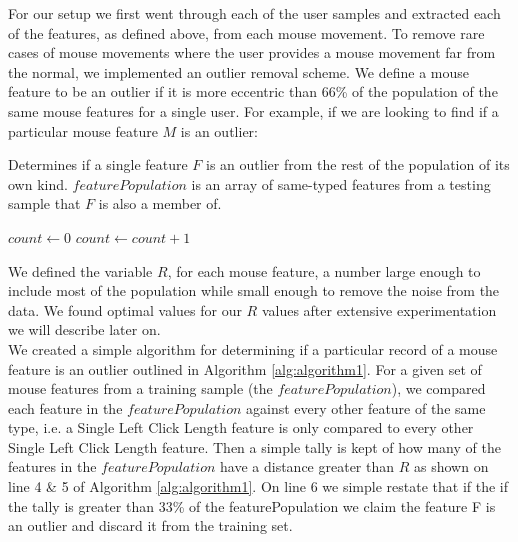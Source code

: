 \documentclass[conference]{IEEEtran}
\begin{document}
For our setup we first went through each of the user samples and extracted each of the features, as defined above, from each mouse movement. To remove rare cases of mouse movements where the user provides a mouse movement far from the normal, we implemented an outlier removal scheme. We define a mouse feature to be an outlier if it is more eccentric than 66\% of the population of the same mouse features for a single user. For example, if we are looking to find if a particular mouse feature $M$ is an outlier:


\begin{algorithm}

\caption{Determines if a single feature $F$ is an outlier from the rest of the population of its own kind. $featurePopulation$ is an array of same-typed features from a testing sample that $F$ is also a member of.}\label{euclid}
\begin{algorithmic}[1]
\State $\textit{count} \gets 0$
				\State $count \gets count + 1$
			\EndIf
	\EndFor

		\State {}
	\Else
		\State {} 

	\EndIf
\EndProcedure
\end{algorithmic}
\label{alg:algorithm1}

\end{algorithm}

We defined the variable $R$, for each mouse feature, a number large enough to include most of the population while small enough to remove the noise from the data. We found optimal values for our $R$ values after extensive experimentation we will describe later on.\\
We created a simple algorithm for determining if a particular record of a mouse feature is an outlier outlined in Algorithm \ref{alg:algorithm1}. For a given set of mouse features from a training sample (the $featurePopulation$), we compared each feature in the $featurePopulation$ against every other feature of the same type, i.e. a Single Left Click Length feature is only compared to every other Single Left Click Length feature. Then a simple tally is kept of how many of the features in the $featurePopulation$ have a distance greater than $R$ as shown on line 4 \& 5 of Algorithm \ref{alg:algorithm1}. On line 6 we simple restate that if the if the tally is greater than 33\% of the featurePopulation we claim the feature F is an outlier and discard it from the training set.
\end{document}
